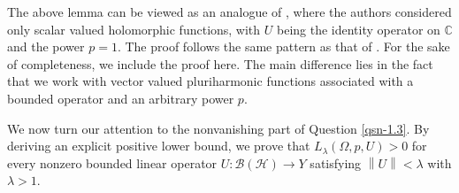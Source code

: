 \documentclass[a4paper,11pt, reqno]{amsart}
\theoremstyle{definition}
\newcommand{\norm}[1]{\left\lVert#1\right\rVert}
\begin{document}
The above lemma can be viewed as an analogue of \cite[Lemma 3.1(1)]{defant-2004}, where the authors considered only scalar valued holomorphic functions, with $U$ being the identity operator on $\mathbb{C}$ and the power $p=1$. The proof follows the same pattern as that of \cite[Lemma 2.5]{defant-2004}. For the sake of completeness, we include the proof here. The main difference lies in the fact that we work with vector valued pluriharmonic functions associated with a bounded operator and an arbitrary power $p$.
\par	
We now turn our attention to the nonvanishing part of Question \ref{qsn-1.3}. By deriving an explicit positive lower bound, we prove that  $L_{\lambda}(\Omega, p,U)>0$ for every nonzero bounded linear operator $U: \mathcal{B}(\mathcal{H}) \rightarrow Y$ satisfying $\norm{U}< \lambda$ with $\lambda>1$.
	
\end{document}
